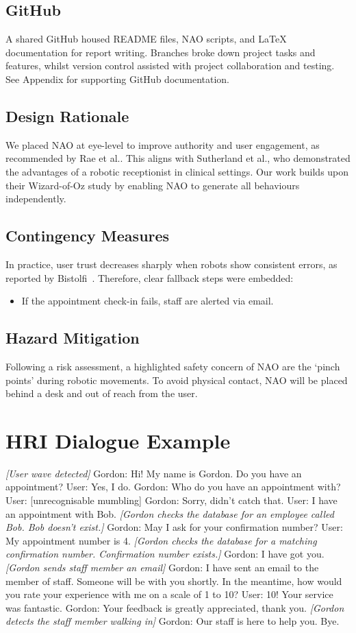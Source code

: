 \documentclass[conference]{IEEEtran}
\begin{document}
\subsection{GitHub} A shared GitHub housed README files, NAO scripts, and LaTeX documentation for report writing. Branches broke down project tasks and features, whilst version control assisted with project collaboration and testing. See Appendix for supporting GitHub documentation.

\subsection{Design Rationale} We placed NAO at eye-level to improve authority and user engagement,
as recommended by Rae et al.\cite{Rae2013}. This aligns with Sutherland et al.\cite{Sutherland2019}, who demonstrated the advantages of
a robotic receptionist in clinical settings. Our work builds upon their Wizard-of-Oz study by enabling NAO to generate all behaviours independently.

\subsection{Contingency Measures} In practice, user trust decreases sharply when robots show consistent errors, as reported by Bistolfi~\cite{Bistolfi2022}.
Therefore, clear fallback steps were embedded:
\begin{itemize}
        \item If the appointment check-in fails, staff are alerted via email.
\end{itemize}

\subsection{Hazard Mitigation} Following a risk assessment, a highlighted safety concern of NAO are the ‘pinch points’ during robotic movements. To avoid physical contact, NAO will be placed behind a desk and out of reach from the user.

\section{HRI Dialogue Example}

\textit{[User wave detected]}
Gordon: Hi! My name is Gordon. Do you have an appointment?
User: Yes, I do.
Gordon: Who do you have an appointment with?
User: [unrecognisable mumbling]
Gordon: Sorry, didn't catch that.
User: I have an appointment with Bob.
\textit{[Gordon checks the database for an employee called Bob. Bob doesn’t exist.]}
Gordon: May I ask for your confirmation number?
User: My appointment number is 4.
\textit{[Gordon checks the database for a matching confirmation number. Confirmation number exists.]}
Gordon: I have got you.
\textit{[Gordon sends staff member an email]}
Gordon: I have sent an email to the member of staff. Someone will be with you shortly.  In the meantime, how would you rate your experience with me on a scale of 1 to 10?
User: 10! Your service was fantastic.
Gordon: Your feedback is greatly appreciated, thank you. 
\textit{[Gordon detects the staff member walking in]}
Gordon: Our staff is here to help you. Bye.
\end{document}
